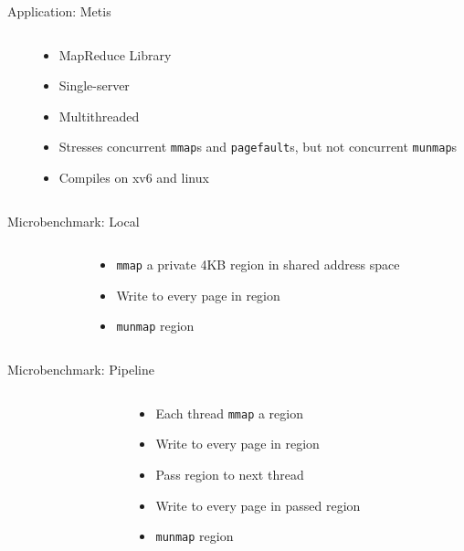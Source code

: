 \documentclass[aspectratio=169]{beamer}
\newcommand{\bi}{\begin{itemize}}
\newcommand{\ei}{\end{itemize}}
\begin{document}
\begin{frame}{Application: Metis}
  \begin{columns}[T]
    \begin{column}{0.5\textwidth}
      
    \end{column}
    \begin{column}{0.5\textwidth}
      \bi
    \item MapReduce Library
    \item Single-server
    \item Multithreaded
    \item Stresses concurrent \texttt{mmap}s and \texttt{pagefault}s, but not concurrent \texttt{munmap}s
    \item Compiles on xv6 and linux
      \ei
    \end{column}
  \end{columns}
\end{frame}

\begin{frame}{Microbenchmark: Local}
  \begin{columns}[T]
    \begin{column}{0.5\textwidth}
      
    \end{column}
    \begin{column}{0.5\textwidth}
      \bi
    \item \texttt{mmap} a private 4KB region in shared address space
    \item Write to every page in region
    \item \texttt{munmap} region
      \ei
    \end{column}
  \end{columns}
\end{frame}

\begin{frame}{Microbenchmark: Pipeline}
  \begin{columns}[T]
    \begin{column}{0.5\textwidth}
      
    \end{column}
    \begin{column}{0.5\textwidth}
      \bi
    \item Each thread \texttt{mmap} a region
    \item Write to every page in region
    \item Pass region to next thread
    \item Write to every page in passed region
    \item \texttt{munmap} region
      \ei
    \end{column}
  \end{columns}
\end{frame}
\end{document}
